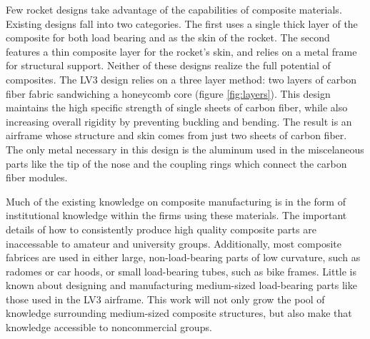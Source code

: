 \documentclass{aiaa-tc}%
\begin{document}
Few rocket designs take advantage of the capabilities of composite materials. Existing designs fall into two categories. The first uses a single thick layer of the composite for both load bearing and as the skin of the rocket. The second features a thin composite layer for the rocket's skin, and relies on a metal frame for structural support. 
Neither of these designs realize the full potential of composites. The LV3 design relies on a three layer method: two layers of carbon fiber fabric sandwiching a honeycomb core (figure \ref{fig:layers}). This design maintains the high specific strength of single sheets of carbon fiber, while also increasing overall rigidity by preventing buckling and bending. 
The result is an airframe whose structure and skin comes from just two sheets of carbon fiber. The only metal necessary in this design is the aluminum used in the miscelaneous parts like the tip of the nose and the coupling rings which connect the carbon fiber modules. 

Much of the existing knowledge on composite manufacturing is in the form of institutional knowledge within the firms using these materials. The important details of how to consistently produce high quality composite parts are inaccessable to amateur and university groups. 
Additionally, most composite fabrices are used in either large, non-load-bearing parts of low curvature, such as radomes or car hoods, or small load-bearing tubes, such as bike frames. Little is known about designing and manufacturing medium-sized load-bearing parts like those used in the LV3 airframe. This work will not only grow the pool of knowledge surrounding medium-sized composite structures, but also make that knowledge accessible to noncommercial groups. 

\end{document}
